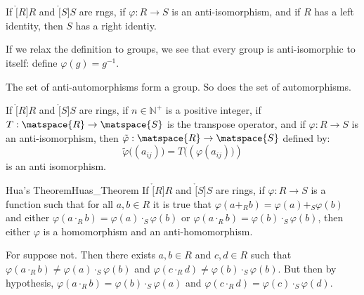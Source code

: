            \begin{theorem}
                If $\ring[R]{R}$ and $\ring[S]{S}$ are rngs, if
                $\varphi:R\rightarrow{S}$ is an anti-isomorphism, and if
                $R$ has a left identity, then $S$ has a right identiy.
            \end{theorem}
            If we relax the definition to groups, we see that every group is
            anti-isomorphic to itself: define $\varphi(g)=g^{\minus{1}}$.
            \begin{theorem}
                The set of anti-automorphisms form a group. So does the set
                of automorphisms.
            \end{theorem}
            \begin{theorem}
                If $\ring[R]{R}$ and $\ring[S]{S}$ are rings, if
                $n\in\mathbb{N}^{+}$ is a positive integer, if
                $T:\matspace{R}\rightarrow\matspace{S}$ is the transpose
                operator, and if $\varphi:R\rightarrow{S}$ is an
                anti-isomorphism, then
                $\tilde{\varphi}:\matspace{R}\rightarrow\matspace{S}$
                defined by:
                \begin{equation}
                    \tilde{\varphi}\big((a_{ij})\big)
                        =T\big((\varphi(a_{ij})\big))
                \end{equation}
                is an anti isomorphism.
            \end{theorem}
            \begin{ftheorem}{Hua's Theorem}{Huas_Theorem}
                If $\ring[R]{R}$ and $\ring[S]{S}$ are rings, if
                $\varphi:R\rightarrow{S}$ is a function such that for all
                $a,b\in{R}$ it is true that
                $\varphi(a+_{R}b)=\varphi(a)+_{S}\varphi(b)$ and either
                $\varphi(a\cdot_{R}b)=\varphi(a)\cdot_{S}\varphi(b)$ or
                $\varphi(a\cdot_{R}b)=\varphi(b)\cdot_{S}\varphi(b)$, then
                either $\varphi$ is a homomorphism and an anti-homomorphism.
            \end{ftheorem}
            \begin{bproof}
                For suppose not. Then there exists $a,b\in{R}$ and
                $c,d\in{R}$ such that
                $\varphi(a\cdot_{R}b)\ne\varphi(a)\cdot_{S}\varphi(b)$ and
                $\varphi(c\cdot_{R}d)\ne\varphi(b)\cdot_{S}\varphi(b)$. But
                then by hypothesis,
                $\varphi(a\cdot_{R}b)=\varphi(b)\cdot_{S}\varphi(a)$ and
                $\varphi(c\cdot_{R}d)=\varphi(c)\cdot_{S}\varphi(d)$.
            \end{bproof}
